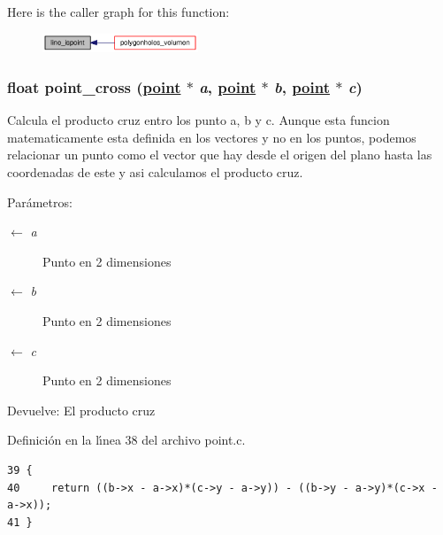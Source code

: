 Here is the caller graph for this function:\begin{figure}[H]
\begin{center}
\leavevmode
\includegraphics[width=132pt]{group__geometry_g68d4dad9b8e742b0d63affc853f80391_g68d4dad9b8e742b0d63affc853f80391_icgraph}
\end{center}
\end{figure}
\hypertarget{group__geometry_gb97527165a510655ee37cd3ccfa8d932_gb97527165a510655ee37cd3ccfa8d932}{
\subsubsection[point\_\-cross]{\setlength{\rightskip}{0pt plus 5cm}float point\_\-cross (\hyperlink{struct__point}{point} $\ast$ {\em a}, \hyperlink{struct__point}{point} $\ast$ {\em b}, \hyperlink{struct__point}{point} $\ast$ {\em c})}}
\label{group__geometry_gb97527165a510655ee37cd3ccfa8d932_gb97527165a510655ee37cd3ccfa8d932}


Calcula el producto cruz entro los punto a, b y c. Aunque esta funcion matematicamente esta definida en los vectores y no en los puntos, podemos relacionar un punto como el vector que hay desde el origen del plano hasta las coordenadas de este y asi calculamos el producto cruz.

\begin{Desc}
\item[Par\'{a}metros:]
\begin{description}
\item[\mbox{$\leftarrow$} {\em a}]Punto en 2 dimensiones \item[\mbox{$\leftarrow$} {\em b}]Punto en 2 dimensiones \item[\mbox{$\leftarrow$} {\em c}]Punto en 2 dimensiones \end{description}
\end{Desc}
\begin{Desc}
\item[Devuelve:]El producto cruz \end{Desc}


Definici\'{o}n en la l\'{\i}nea 38 del archivo point.c.

\begin{Code}\begin{verbatim}39 {
40     return ((b->x - a->x)*(c->y - a->y)) - ((b->y - a->y)*(c->x - a->x));
41 }
\end{verbatim}\end{Code}




